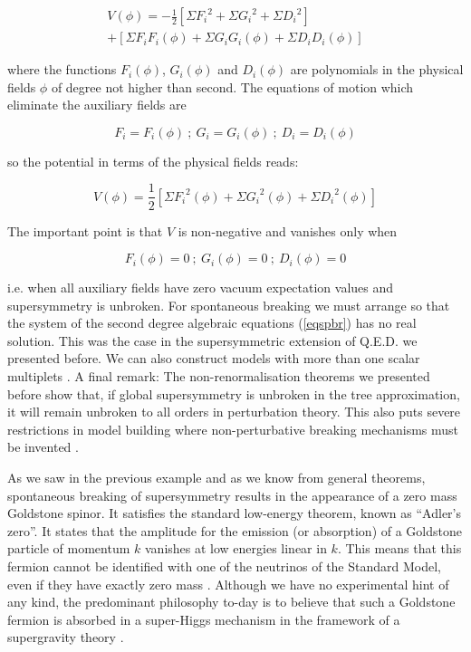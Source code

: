 \documentclass[a4paper,11pt]{article}
\begin{document}
\begin{eqnarray}
\label{scpot}
V(\phi)=-{\scriptstyle {\frac{1}{2}}}[\Sigma {F_i}^2 +\Sigma
{G_i}^2 +\Sigma {D_i}^2  ]\nonumber  \\  +  [\Sigma F_i F_i (\phi)
+\Sigma G_i G_i (\phi) +\Sigma D_i D_i (\phi)  ]    
\end{eqnarray}

\noindent
where the functions $F_i(\phi)$, $G_i(\phi)$ and $D_i(\phi)$ are
polynomials in the physical fields $\phi$ of degree not higher than
second. The equations of motion which eliminate the auxiliary fields
are

\begin{equation}
\label{auxfields}
F_i=F_i(\phi) \ ; \ G_i=G_i(\phi) \ ; \ D_i=D_i(\phi) 
\end{equation}
 
\noindent
so the potential in terms of the physical fields reads:


\begin{equation}
\label{phypot}
V(\phi)={\scriptstyle {\frac{1}{2}}}[\Sigma {F_i}^2 (\phi)+\Sigma
{G_i}^2 (\phi)+\Sigma {D_i}^2 (\phi)] 
\end{equation}

The important point is that $V$ is non-negative and vanishes only when

\begin{equation}
\label{eqspbr}
F_i(\phi)=0 \ ; \ G_i(\phi)=0 \ ; \ D_i(\phi)=0 
\end{equation}

\noindent
i.e. when all auxiliary fields have zero
vacuum expectation values and supersymmetry is unbroken. For
spontaneous breaking we must arrange so that the system  of the
second degree algebraic equations (\ref{eqspbr}) has no real
solution. This was the case in the supersymmetric extension of
Q.E.D. we presented before. We can also construct models with more
than one scalar multiplets \cite{FO}. A final remark: The
non-renormalisation theorems we presented before show that, if global 
supersymmetry is unbroken in the tree approximation, it will remain
unbroken to all orders in perturbation theory. This also puts severe
restrictions in model building where non-perturbative breaking
mechanisms must be invented \cite{W}.  

As we saw in the previous example and as we know from general theorems,
spontaneous breaking of supersymmetry results in the appearance of a
zero mass Goldstone spinor. It satisfies the standard low-energy
theorem, known as ``Adler's zero''. It states that the amplitude for
the emission (or absorption) of a Goldstone particle of momentum $k$
vanishes at low energies linear in $k$. This means that this fermion
cannot be identified with one of the neutrinos of the Standard Model,
even if they have exactly zero mass \cite{WF}. Although we have no experimental
hint of any kind, the predominant philosophy to-day is to believe that
such a Goldstone fermion is absorbed in a super-Higgs mechanism in the
framework of a supergravity theory \cite{VS}.
\end{document}
